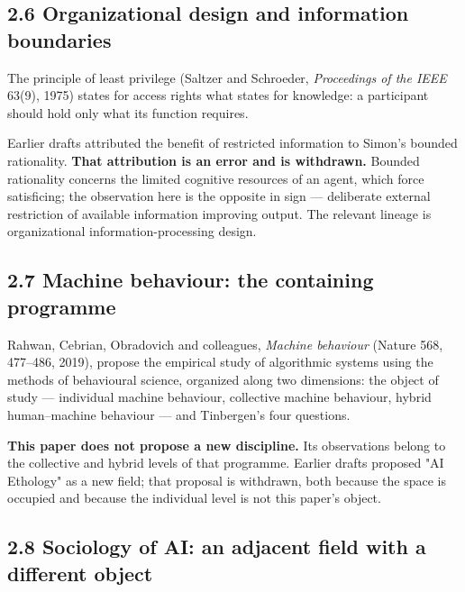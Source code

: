 \subsection*{2.6 Organizational design and information boundaries}
\label{sec:en:2.6}

\gcheck{} The principle of least privilege (Saltzer and Schroeder, \emph{Proceedings of the IEEE} 63(9), 1975) states for access rights what  states for knowledge: a participant should hold only what its function requires.
\nocite{saltzer1975protection}

Earlier drafts attributed the benefit of restricted information to Simon's bounded rationality. \textbf{That attribution is an error and is withdrawn.} Bounded rationality concerns the limited cognitive resources of an agent, which force satisficing; the observation here is the opposite in sign — deliberate external restriction of available information improving output. The relevant lineage is organizational information-processing design.


\subsection*{2.7 Machine behaviour: the containing programme}
\label{sec:en:2.7}

\gcheck{} Rahwan, Cebrian, Obradovich and colleagues, \emph{Machine behaviour} (Nature 568, 477–486, 2019), propose the empirical study of algorithmic systems using the methods of behavioural science, organized along two dimensions: the object of study — individual machine behaviour, collective machine behaviour, hybrid human–machine behaviour — and Tinbergen's four questions.
\nocite{rahwan2019machine}

\textbf{This paper does not propose a new discipline.} Its observations belong to the collective and hybrid levels of that programme. Earlier drafts proposed "AI Ethology" as a new field; that proposal is withdrawn, both because the space is occupied and because the individual level is not this paper's object.


\subsection*{2.8 Sociology of AI: an adjacent field with a different object}
\label{sec:en:2.8}

